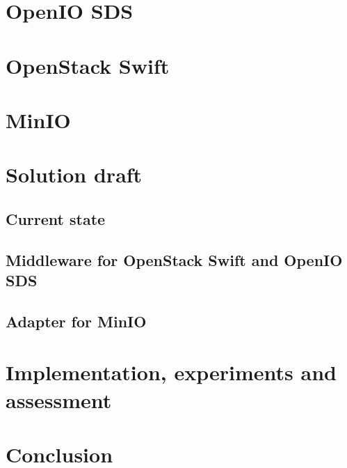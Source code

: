 \chapter{OpenIO SDS}
\chapter{OpenStack Swift}
\chapter{MinIO}

\chapter{Solution draft}
\section{Current state}
\section{Middleware for OpenStack Swift and OpenIO SDS}
\section{Adapter for MinIO}
\chapter{Implementation, experiments and assessment}

\chapter{Conclusion}

